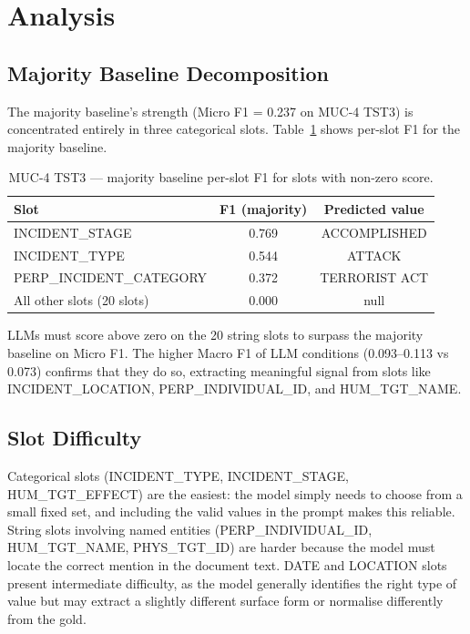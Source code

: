 \documentclass[11pt,a4paper]{article}
\begin{document}
\section{Analysis}
\label{sec:analysis}

\subsection{Majority Baseline Decomposition}

The majority baseline's strength (Micro F1 = 0.237 on MUC-4 TST3) is concentrated entirely in three categorical slots. Table~\ref{tab:majority_breakdown} shows per-slot F1 for the majority baseline.

\begin{table}[h]
\centering
\caption{MUC-4 TST3 — majority baseline per-slot F1 for slots with non-zero score.}
\label{tab:majority_breakdown}
\begin{tabular}{lcc}
\toprule
\textbf{Slot} & \textbf{F1 (majority)} & \textbf{Predicted value} \\
\midrule
INCIDENT\_STAGE              & 0.769 & ACCOMPLISHED \\
INCIDENT\_TYPE               & 0.544 & ATTACK \\
PERP\_INCIDENT\_CATEGORY     & 0.372 & TERRORIST ACT \\
All other slots (20 slots)   & 0.000 & null \\
\bottomrule
\end{tabular}
\end{table}

LLMs must score above zero on the 20 string slots to surpass the majority baseline on Micro F1. The higher Macro F1 of LLM conditions (0.093--0.113 vs 0.073) confirms that they do so, extracting meaningful signal from slots like INCIDENT\_LOCATION, PERP\_INDIVIDUAL\_ID, and HUM\_TGT\_NAME.

\subsection{Slot Difficulty}

Categorical slots (INCIDENT\_TYPE, INCIDENT\_STAGE, HUM\_TGT\_EFFECT) are the easiest: the model simply needs to choose from a small fixed set, and including the valid values in the prompt makes this reliable. String slots involving named entities (PERP\_INDIVIDUAL\_ID, HUM\_TGT\_NAME, PHYS\_TGT\_ID) are harder because the model must locate the correct mention in the document text. DATE and LOCATION slots present intermediate difficulty, as the model generally identifies the right type of value but may extract a slightly different surface form or normalise differently from the gold.
\end{document}
